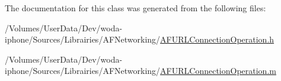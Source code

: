 The documentation for this class was generated from the following files\-:\begin{DoxyCompactItemize}
\item 
/\-Volumes/\-User\-Data/\-Dev/woda-\/iphone/\-Sources/\-Librairies/\-A\-F\-Networking/\hyperlink{_a_f_u_r_l_connection_operation_8h}{A\-F\-U\-R\-L\-Connection\-Operation.\-h}\item 
/\-Volumes/\-User\-Data/\-Dev/woda-\/iphone/\-Sources/\-Librairies/\-A\-F\-Networking/\hyperlink{_a_f_u_r_l_connection_operation_8m}{A\-F\-U\-R\-L\-Connection\-Operation.\-m}\end{DoxyCompactItemize}
